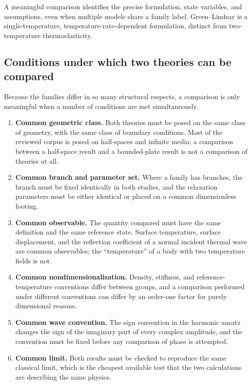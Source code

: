 A meaningful comparison identifies the precise formulation, state variables, and assumptions, even when multiple models share a family label. Green--Lindsay is a single-temperature, temperature-rate-dependent formulation, distinct from two-temperature thermoelasticity.

\subsection{Conditions under which two theories can be compared}
\label{sec:12.5}

Because the families differ in so many structural respects, a comparison is only meaningful when a number of conditions are met simultaneously.

\begin{enumerate}
\item \textbf{Common geometric class.} Both theories must be posed on the same class of geometry, with the same class of boundary conditions. Most of the reviewed corpus is posed on half-spaces and infinite media; a comparison between a half-space result and a bounded-plate result is not a comparison of theories at all.
\item \textbf{Common branch and parameter set.} Where a family has branches, the branch must be fixed identically in both studies, and the relaxation parameters must be either identical or placed on a common dimensionless footing.
\item \textbf{Common observable.} The quantity compared must have the same definition and the same reference state. Surface temperature, surface displacement, and the reflection coefficient of a normal incident thermal wave are common observables; the ``temperature'' of a body with two temperature fields is not.
\item \textbf{Common nondimensionalisation.} Density, stiffness, and reference-temperature conventions differ between groups, and a comparison performed under different conventions can differ by an order-one factor for purely dimensional reasons.
\item \textbf{Common wave convention.} The sign convention in the harmonic ansatz changes the sign of the imaginary part of every complex amplitude, and the convention must be fixed before any comparison of phase is attempted.
\item \textbf{Common limit.} Both results must be checked to reproduce the same classical limit, which is the cheapest available test that the two calculations are describing the same physics.
\end{enumerate}

